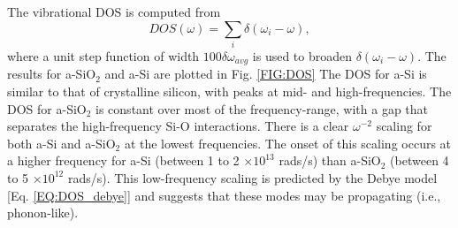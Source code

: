 \documentclass[aps,prb,twocolumn,superscriptaddress,footinbib,amsmath,amssymb,floatfix]{revtex4}
\begin{document}
The vibrational DOS is computed from  
\begin{equation}\label{EQ:DOS}
DOS(\omega) = \sum_i \delta(\omega_i - \omega),
\end{equation}
where a unit step function of width $100\delta\omega_{avg}$ 
is used to broaden $\delta(\omega_i - \omega)$.   
The results for a-SiO$_2$ and a-Si are plotted in Fig. \ref{FIG:DOS} 
The DOS for a-Si is similar to that of crystalline silicon,
\cite{allen_diffusons_1999,donadio_atomistic_2009} with 
peaks at mid- and high-frequencies. The DOS for 
a-SiO$_2$ is constant over most of the frequency-range, 
with a gap that separates the high-frequency Si-O
interactions.\cite{mcgaughey_thermal_2004} 
There is a clear $\omega^{-2}$ scaling for both 
a-Si and a-SiO$_2$ at the lowest frequencies. 
The onset of this scaling occurs at a higher frequency 
for a-Si (between 1 to 2 $\times 10^{13}$ rads/s) 
than a-SiO$_2$ (between 4 to 5 $\times 10^{12}$ rads/s). 
This low-frequency scaling is predicted 
by the Debye model [Eq. \eqref{EQ:DOS_debye}] 
and suggests that these modes may be 
propagating (i.e., phonon-like). 

% 
% 

\clearpage
\end{document}
